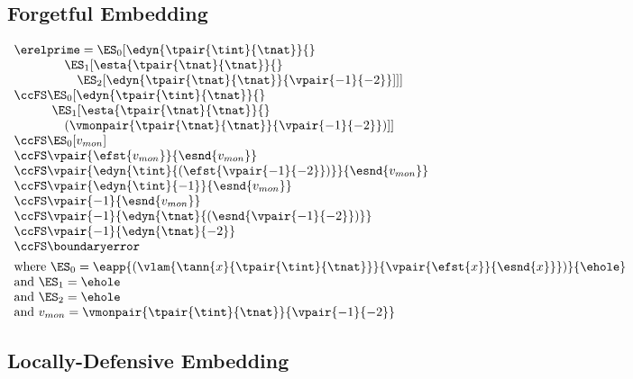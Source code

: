 \subsection{Forgetful Embedding}

$\begin{array}{l}
  \erelprime = \ES_0[\edyn{\tpair{\tint}{\tnat}}{}
\\\qquad\quad\quad \ES_1[\esta{\tpair{\tnat}{\tnat}}{}
\\\qquad\quad\quad\quad \ES_2[\edyn{\tpair{\tnat}{\tnat}}{\vpair{-1}{-2}}]]]
\\\ccFS \ES_0[\edyn{\tpair{\tint}{\tnat}}{}
\\\qquad\quad \ES_1[\esta{\tpair{\tnat}{\tnat}}{}
\\\qquad\quad\quad (\vmonpair{\tpair{\tnat}{\tnat}}{\vpair{-1}{-2}})]]
\\\ccFS \ES_0[v_{mon}]
\\\ccFS \vpair{\efst{v_{mon}}}{\esnd{v_{mon}}}
\\\ccFS \vpair{\edyn{\tint}{(\efst{\vpair{-1}{-2}})}}{\esnd{v_{mon}}}
\\\ccFS \vpair{\edyn{\tint}{{-1}}}{\esnd{v_{mon}}}
\\\ccFS \vpair{{-1}}{\esnd{v_{mon}}}
\\\ccFS \vpair{{-1}}{\edyn{\tnat}{(\esnd{\vpair{-1}{-2}})}}
\\\ccFS \vpair{{-1}}{\edyn{\tnat}{-2}}
\\\ccFS \boundaryerror
\\[1ex]
  \mbox{where } \ES_0 = \eapp{(\vlam{\tann{x}{\tpair{\tint}{\tnat}}}{\vpair{\efst{x}}{\esnd{x}}})}{\ehole}
\\\mbox{and } \ES_1 = \ehole
\\\mbox{and } \ES_2 = \ehole
\\\mbox{and } v_{mon} = \vmonpair{\tpair{\tint}{\tnat}}{\vpair{-1}{-2}}
\end{array}$

\subsection{Locally-Defensive Embedding}

